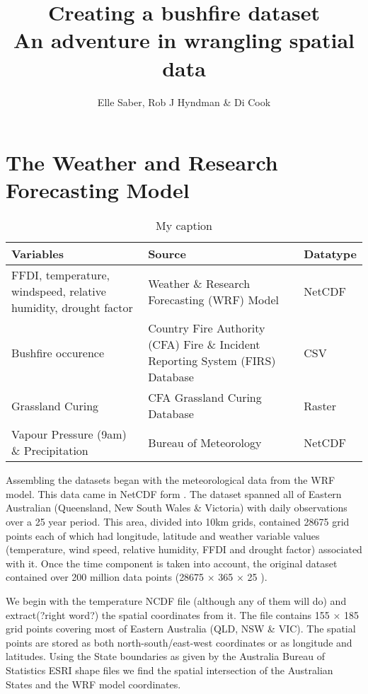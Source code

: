 \documentclass[11pt,a4paper]{article}
\title{Creating a bushfire dataset \\ An adventure in wrangling spatial data}
\author{Elle Saber, Rob J Hyndman \& Di Cook}
\begin{document}
	\maketitle
	
	\section{The Weather and Research Forecasting Model}
	
	\begin{table}
		\centering
		\caption{My caption}
		\label{my-label}
		\begin{tabular}{|l|l|l|}
			\hline
			Variables                                                       & Source                                                                         & Datatype \\ \hline
			FFDI, temperature, windspeed, relative humidity, drought factor & Weather \& Research Forecasting (WRF) Model                                    & NetCDF   \\ \hline
			Bushfire occurence                                              & Country Fire Authority (CFA) Fire \& Incident Reporting System (FIRS) Database & CSV      \\ \hline
			Grassland Curing                                                & CFA Grassland Curing Database                                                  & Raster   \\ \hline
			Vapour Pressure (9am) \& Precipitation                          & Bureau of Meteorology                                                          & NetCDF   \\ \hline
		\end{tabular}
	\end{table}
	
	Assembling the datasets began with the meteorological data from the WRF model. This data came in NetCDF form \citep{ncdf}. The dataset spanned all of Eastern Australian (Queensland, New South Wales \& Victoria) with daily observations over a 25 year period. This area, divided into 10km grids, contained 28675 grid points each of which had longitude, latitude and weather variable values (temperature, wind speed, relative humidity, FFDI and drought factor) associated with it. Once the time component is taken into account, the original dataset contained over 200 million data points (28675 $\times$ 365 $\times$ 25 ). 
	
	We begin with the temperature NCDF file (although any of them will do) and extract(?right word?) the spatial coordinates from it. The file contains 155 $\times$ 185  grid points covering most of Eastern Australia (QLD, NSW \& VIC). The spatial points are stored as both north-south/east-west coordinates or as longitude and latitudes. Using the State boundaries as given by the Australia Bureau of Statistics ESRI shape files we find the spatial intersection of the Australian States and the WRF model coordinates. 
	
\end{document}
